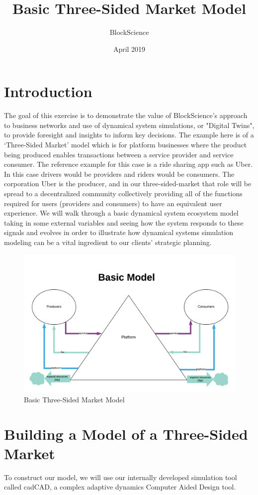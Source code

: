 \documentclass[12pt]{extarticle}
\title{Basic Three-Sided Market Model}
\author{BlockScience}
\date{April 2019}
\begin{document}
\maketitle


\section{Introduction}
The goal of this exercise is to demonstrate the value of BlockScience's approach to business networks and use of dynamical system simulations, or "Digital Twins", to provide foresight and insights to inform key decisions.  The example here is of a  ‘Three-Sided Market’ model which is for platform businesses where the product being produced enables transactions between a service provider and service consumer. The reference example for this case is a ride sharing app such as Uber. In this case drivers would be providers and riders would be consumers. The corporation Uber is the producer, and in our three-sided-market that role will be spread to a decentralized community collectively providing all of the functions required for users (providers and consumers) to have an equivalent user experience. We will walk through a basic dynamical system ecosystem model taking in some external variables and seeing how the system responds to these signals and evolves in order to illustrate how dynamical systems simulation modeling can be a vital ingredient to our clients' strategic planning.

\begin{figure}[h]
	\centering
	\includegraphics[width=1\textwidth]{images/3SidedMarketBasicDemo.png}
	\caption{Basic Three-Sided Market Model}
\end{figure}
\newpage
\section{Building a Model of a Three-Sided Market}
To construct our model, we will use our internally developed simulation tool called cadCAD, a complex adaptive dynamics Computer Aided Design tool. \\
\end{document}
